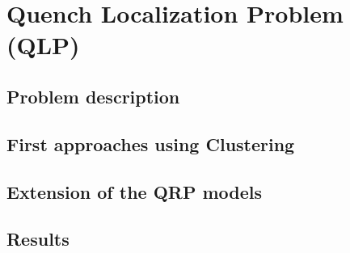 \chapter{Quench Localization Problem (QLP)}
\label{chp:qlp}
\section{Problem description}
\section{First approaches using Clustering}
\section{Extension of the QRP models}
\section{Results}
